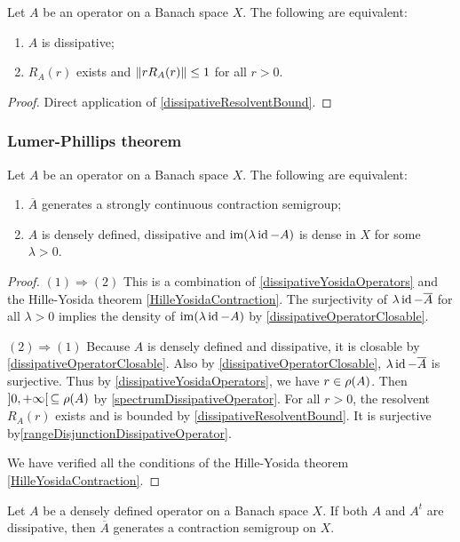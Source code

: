 \begin{lemma} \label{dissipativeYosidaOperators}
Let $A$ be an operator on a Banach space $X$. The following are equivalent:
\begin{enumerate}
\item $A$ is dissipative;
\item $R_A(r)$ exists and $\lVert rR_A(r)\rVert\leq 1$ for all $r>0$.
\end{enumerate}
\end{lemma}
\begin{proof}
Direct application of \ref{dissipativeResolventBound}.
\end{proof}

\subsubsection{Lumer-Phillips theorem}
\begin{theorem} \label{LumerPhillips}
Let $A$ be an operator on a Banach space $X$. The following are equivalent:
\begin{enumerate}
\item $\overline{A}$ generates a strongly continuous contraction semigroup;
\item $A$ is densely defined, dissipative and $\operatorname{im}(\lambda\operatorname{id}-A)$ is dense in $X$ for some $\lambda > 0$.
\end{enumerate}
\end{theorem}
\begin{proof}
$(1) \Rightarrow (2)$  This is a combination of \ref{dissipativeYosidaOperators} and the Hille-Yosida theorem \ref{HilleYosidaContraction}. The surjectivity of $\lambda\operatorname{id}-\overline{A}$ for all $\lambda > 0$ implies the density of $\operatorname{im}(\lambda\operatorname{id}-A)$ by \ref{dissipativeOperatorClosable}.

$(2) \Rightarrow (1)$ Because $A$ is densely defined and dissipative, it is closable by \ref{dissipativeOperatorClosable}.
Also by \ref{dissipativeOperatorClosable}, $\lambda\operatorname{id}-\overline{A}$ is surjective. Thus by \ref{dissipativeYosidaOperators}, we have $r\in \rho(A)$. Then $]0,+\infty[\,\subseteq \rho(A)$ by \ref{spectrumDissipativeOperator}.
For all $r>0$, the resolvent $R_A(r)$ exists and is bounded by \ref{dissipativeResolventBound}. It is surjective by\ref{rangeDisjunctionDissipativeOperator}.

We have verified all the conditions of the Hille-Yosida theorem \ref{HilleYosidaContraction}.
\end{proof}
\begin{corollary}
Let $A$ be a densely defined operator on a Banach space $X$. If both $A$ and $A^t$ are dissipative, then $\overline{A}$ generates a contraction semigroup on $X$.
\end{corollary}
